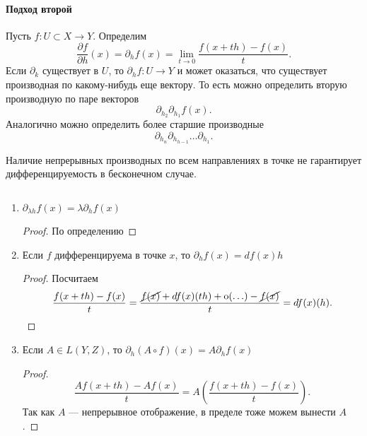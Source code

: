 \paragraph{Подход второй}
\begin{defn}
    Пусть $ f\colon U \subset  X \to  Y$. Определим
    \[
	\frac{\partial f}{\partial h}(x) = \partial _h f(x) = \lim_{t \to  0} \frac{f(x+th) - f(x)}{t} 
    .\] 
    Если $ \partial _k$ существует в $ U$, то  $ \partial _h f \colon U \to  Y$ и может оказаться, что существует производная по какому-нибудь еще вектору.
	То есть можно определить вторую производную по паре векторов
    \[
	\partial _{h_2} \partial _{h_1}f(x)
    .\] 
    Аналогично можно определить более старшие производные
    \[
    \partial _{ h_n } \partial _{h_{h-1}} \ldots  \partial _{h_1}
    .\] 
\end{defn}
\begin{note}
    Наличие непрерывных производных по всем направлениях в точке не гарантирует дифференцируемость в бесконечном случае.
\end{note}
\begin{prop}
    $ $
    \begin{enumerate}[noitemsep]
	\item $ \partial _{\lambda h}f(x) = \lambda \partial_h f(x)$
		\begin{proof}
		    По определению
		\end{proof}
	\item Если $ f$ дифференцируема в точке  $ x$, то  $ \partial _h f(x) = df(x) h$
		\begin{proof}
			Посчитаем
			\[
				\frac{f(x+th) - f(x)}{t} = \frac{\cancel{f(x)} + df(x)(th) + {\mathop{\text{\rm o}}}(\ldots ) - \cancel{f(x)}}{t}  = df(x)(h)
			.\] 
		\end{proof}
	\item Если $ A \in L(Y, Z) $, то $ \partial _h (A \circ f) (x) = A\partial _h f(x)$
		\begin{proof}
		    \[
				\frac{Af(x+th) - Af(x)}{t} = A \left( \frac{f(x+th) - f(x)}{t} \right) 
		    .\] 
			Так как $ A$ --- непрерывное отображение, в пределе тоже можем вынести  $ A$.
		\end{proof}
    \end{enumerate}
\end{prop}
